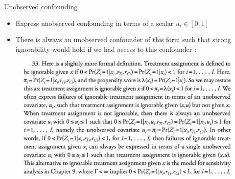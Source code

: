 \documentclass[table, xcolor={dvipsnames}, 9pt]{beamer}
\theoremstyle{newstyle}
\begin{document}
\begin{frame}{Unobserved confounding}
\begin{itemize}
\item Express unobserved confounding in terms of a scalar $u_i \in \left[0, 1\right]$
\item \pause There is always an unobserved confounder of this form such that strong ignorability would hold if we had access to this confounder \citep[][300, footnote 33]{rosenbaum2017}: \pause 
\end{itemize}
\begin{figure}
\includegraphics[width = \linewidth]{Rosenbaum_2017_page_300_footnote_33.jpg}
\end{figure}
\end{frame}
\end{document}
